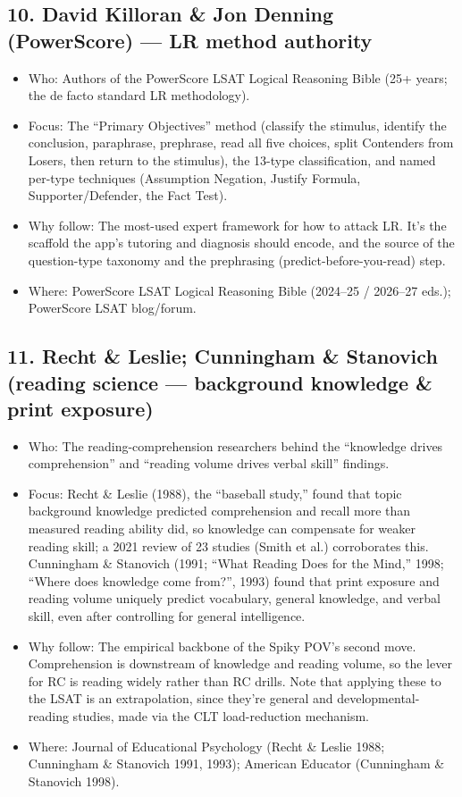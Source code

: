 \documentclass[11pt]{article}
\begin{document}
\subsection*{10. David Killoran \& Jon Denning (PowerScore) --- LR method authority}
\begin{itemize}
\item Who: Authors of the PowerScore LSAT Logical Reasoning Bible (25+ years; the de facto standard LR methodology).
\item Focus: The \enquote{Primary Objectives} method (classify the stimulus, identify the conclusion, paraphrase, prephrase, read all five choices, split Contenders from Losers, then return to the stimulus), the 13-type classification, and named per-type techniques (Assumption Negation, Justify Formula, Supporter/Defender, the Fact Test).
\item Why follow: The most-used expert framework for how to attack LR. It's the scaffold the app's tutoring and diagnosis should encode, and the source of the question-type taxonomy and the prephrasing (predict-before-you-read) step.
\item Where: PowerScore LSAT Logical Reasoning Bible (2024--25 / 2026--27 eds.); PowerScore LSAT blog/forum.
\end{itemize}

\subsection*{11. Recht \& Leslie; Cunningham \& Stanovich (reading science --- background knowledge \& print exposure)}
\begin{itemize}
\item Who: The reading-comprehension researchers behind the \enquote{knowledge drives comprehension} and \enquote{reading volume drives verbal skill} findings.
\item Focus: Recht \& Leslie (1988), the \enquote{baseball study,} found that topic background knowledge predicted comprehension and recall more than measured reading ability did, so knowledge can compensate for weaker reading skill; a 2021 review of 23 studies (Smith et al.) corroborates this. Cunningham \& Stanovich (1991; \enquote{What Reading Does for the Mind,} 1998; \enquote{Where does knowledge come from?}, 1993) found that print exposure and reading volume uniquely predict vocabulary, general knowledge, and verbal skill, even after controlling for general intelligence.
\item Why follow: The empirical backbone of the Spiky POV's second move. Comprehension is downstream of knowledge and reading volume, so the lever for RC is reading widely rather than RC drills. Note that applying these to the LSAT is an extrapolation, since they're general and developmental-reading studies, made via the CLT load-reduction mechanism.
\item Where: Journal of Educational Psychology (Recht \& Leslie 1988; Cunningham \& Stanovich 1991, 1993); American Educator (Cunningham \& Stanovich 1998).
\end{itemize}
\end{document}
